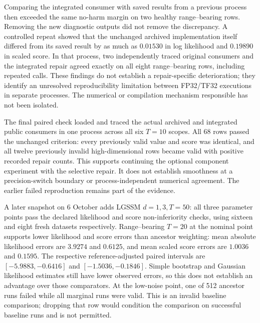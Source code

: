 Comparing the integrated consumer with saved results from a previous process
then exceeded the same no-harm margin on two healthy range--bearing rows.
Removing the new diagnostic outputs did not remove the discrepancy. A
controlled repeat showed that the unchanged archived implementation itself
differed from its saved result by as much as $0.01530$ in log likelihood and
$0.19890$ in scaled score. In that process, two independently traced original
consumers and the integrated repair agreed exactly on all eight
range--bearing rows, including repeated calls. These findings do not establish
a repair-specific deterioration; they identify an unresolved reproducibility
limitation between FP32/TF32 executions in separate processes. The numerical
or compilation mechanism responsible has not been isolated.

The final paired check loaded and traced the actual archived and integrated
public consumers in one process across all six $T=10$ scopes. All 68 rows
passed the unchanged criterion: every previously valid value and score was
identical, and all twelve previously invalid high-dimensional rows became
valid with positive recorded repair counts. This supports continuing the
optional component experiment with the selective repair. It does not establish
smoothness at a precision-switch boundary or process-independent numerical
agreement. The earlier failed reproduction remains part of the evidence.

A later snapshot on 6 October adds LGSSM $d=1,3,T=50$: all three
parameter points pass the declared likelihood and score non-inferiority
checks, using sixteen and eight fresh datasets respectively. Range--bearing
$T=20$ at the nominal point supports lower likelihood and score errors than
ancestor weighting: mean absolute likelihood errors are $3.9274$ and $0.6125$,
and mean scaled score errors are $1.0036$ and $0.1595$. The respective
reference-adjusted paired intervals are $[-5.9883,-0.6416]$ and
$[-1.5036,-0.1846]$. Simple bootstrap and Gaussian likelihood estimates
still have lower observed errors, so this does not establish an advantage
over those comparators. At the low-noise point, one of 512 ancestor runs
failed while all marginal runs were valid. This is an invalid baseline
comparison; dropping that row would condition the comparison on successful
baseline runs and is not permitted.

